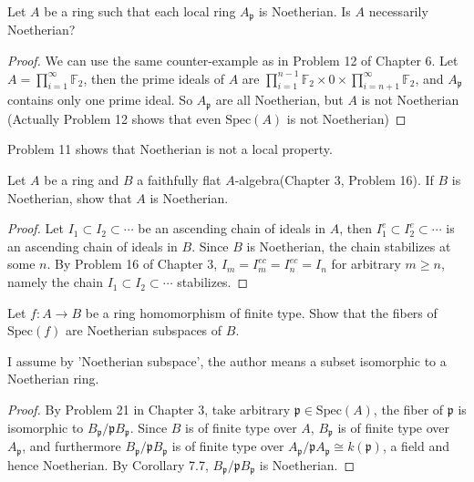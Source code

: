 \documentclass{solution}
\begin{document}
\begin{problem}
    Let $A$ be a ring such that each local ring $A_{\mathfrak{p}}$ is Noetherian. Is $A$ necessarily Noetherian?
\end{problem}

\begin{proof}
    We can use the same counter-example as in Problem 12 of Chapter 6. Let $A = \prod\limits_{i = 1}^{\infty} \mathbb{F}_2$, then the prime ideals of $A$ are $\prod\limits_{i = 1}^{n - 1} \mathbb{F}_2 \times 0 \times \prod\limits_{i = n + 1}^{\infty} \mathbb{F}_2$, and $A_{\mathfrak{p}}$ contains only one prime ideal. So $A_{\mathfrak{p}}$ are all Noetherian, but $A$ is not Noetherian (Actually Problem 12 shows that even $\mathrm{Spec}(A)$ is not Noetherian)
\end{proof}

{\color{red} Problem 11 shows that Noetherian is not a local property.}

\begin{problem}
    Let $A$ be a ring and $B$ a faithfully flat $A$-algebra(Chapter 3, Problem 16). If $B$ is Noetherian, show that $A$ is Noetherian.
\end{problem}

\begin{proof}
    Let $I_1 \subset I_2 \subset \cdots$ be an ascending chain of ideals in $A$, then $I_1^e \subset I_2^e \subset \cdots$ is an ascending chain of ideals in $B$. Since $B$ is Noetherian, the chain stabilizes at some $n$. By Problem 16 of Chapter 3, $I_m = I_m^{ec} = I_n^{ec} = I_n$ for arbitrary $m \ge n$, namely the chain $I_1 \subset I_2 \subset \cdots$ stabilizes.
\end{proof}

\begin{problem}
    Let $f: A \rightarrow B$ be a ring homomorphism of finite type. Show that the fibers of $\mathrm{Spec}(f)$ are Noetherian subspaces of $B$.
\end{problem}

{\color{red} I assume by 'Noetherian subspace', the author means a subset isomorphic to a Noetherian ring.}

\begin{proof}
    By Problem 21 in Chapter 3, take arbitrary $\mathfrak{p} \in \mathrm{Spec}(A)$, the fiber of $\mathfrak{p}$ is isomorphic to $B_{\mathfrak{p}} / \mathfrak{p} B_{\mathfrak{p}}$. Since $B$ is of finite type over $A$, $B_{\mathfrak{p}}$ is of finite type over $A_{\mathfrak{p}}$, and furthermore $B_{\mathfrak{p}} / \mathfrak{p} B_{\mathfrak{p}}$ is of finite type over $A_{\mathfrak{p}} / \mathfrak{p} A_{\mathfrak{p}} \cong k(\mathfrak{p})$, a field and hence Noetherian. By Corollary 7.7, $B_{\mathfrak{p}} / \mathfrak{p} B_{\mathfrak{p}}$ is Noetherian.
\end{proof}
\end{document}
